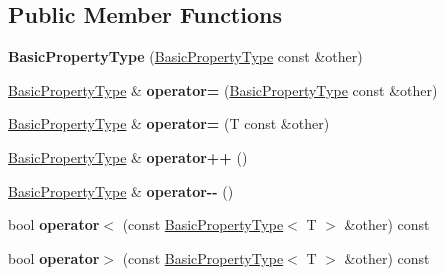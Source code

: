 \subsection*{Public Member Functions}
\begin{DoxyCompactItemize}
\item 
\hypertarget{classBasicPropertyType_a9d967556ec7106be014ef360e8ad729c}{{\bfseries Basic\+Property\+Type} (\hyperlink{classBasicPropertyType}{Basic\+Property\+Type} const \&other)}\label{classBasicPropertyType_a9d967556ec7106be014ef360e8ad729c}

\item 
\hypertarget{classBasicPropertyType_adf19305750a4f3aaf605ae2b18353e32}{\hyperlink{classBasicPropertyType}{Basic\+Property\+Type} \& {\bfseries operator=} (\hyperlink{classBasicPropertyType}{Basic\+Property\+Type} const \&other)}\label{classBasicPropertyType_adf19305750a4f3aaf605ae2b18353e32}

\item 
\hypertarget{classBasicPropertyType_a993468c37a7ac66e8897c3477404301f}{\hyperlink{classBasicPropertyType}{Basic\+Property\+Type} \& {\bfseries operator=} (T const \&other)}\label{classBasicPropertyType_a993468c37a7ac66e8897c3477404301f}

\item 
\hypertarget{classBasicPropertyType_ad01cb6c2ae97f0b4b9d57cbca77077ee}{\hyperlink{classBasicPropertyType}{Basic\+Property\+Type} \& {\bfseries operator++} ()}\label{classBasicPropertyType_ad01cb6c2ae97f0b4b9d57cbca77077ee}

\item 
\hypertarget{classBasicPropertyType_a1ff6ae706f6d093f43165a6f00268dee}{\hyperlink{classBasicPropertyType}{Basic\+Property\+Type} \& {\bfseries operator-\/-\/} ()}\label{classBasicPropertyType_a1ff6ae706f6d093f43165a6f00268dee}

\item 
\hypertarget{classBasicPropertyType_ae2a1d3c9885b05c9d022d1a01e28888e}{bool {\bfseries operator$<$} (const \hyperlink{classBasicPropertyType}{Basic\+Property\+Type}$<$ T $>$ \&other) const }\label{classBasicPropertyType_ae2a1d3c9885b05c9d022d1a01e28888e}

\item 
\hypertarget{classBasicPropertyType_a6cb6f98a17ae2ae19c94643de930a73c}{bool {\bfseries operator$>$} (const \hyperlink{classBasicPropertyType}{Basic\+Property\+Type}$<$ T $>$ \&other) const }\label{classBasicPropertyType_a6cb6f98a17ae2ae19c94643de930a73c}


\end{DoxyCompactItemize}
